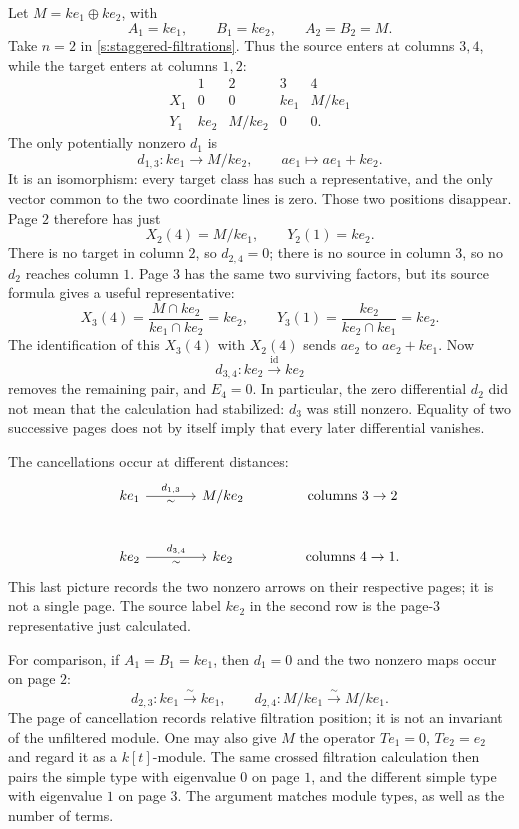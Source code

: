 \documentclass[11pt]{article}
\theoremstyle{definition}
\theoremstyle{remark}\newtheorem{remark}[theorem]{Remark}
\newcommand{\id}{\mathrm{id}}
\newcommand{\kk}{k}
\newcommand{\iso}{\xrightarrow{\sim}}
\begin{document}
Let $M=\kk e_1\oplus\kk e_2$, with
\[
A_1=\kk e_1,\qquad B_1=\kk e_2,\qquad A_2=B_2=M.
\]
Take $n=2$ in \eqref{s:staggered-filtrations}. Thus the source enters at
columns $3,4$, while the target enters at columns $1,2$:
\[
\begin{array}{c|cccc}
&1&2&3&4\\ \hline
X_1&0&0&\kk e_1&M/\kk e_1\\
Y_1&\kk e_2&M/\kk e_2&0&0.
\end{array}
\]
The only potentially nonzero $d_1$ is
\[
d_{1,3}:\kk e_1\longrightarrow M/\kk e_2,
\qquad ae_1\longmapsto ae_1+\kk e_2.
\]
It is an isomorphism: every target class has such a representative, and
the only vector common to the two coordinate lines is zero. Those two
positions disappear. Page $2$ therefore has just
\[
X_2(4)=M/\kk e_1,\qquad Y_2(1)=\kk e_2.
\]
There is no target in column $2$, so $d_{2,4}=0$; there is no source
in column $3$, so no $d_2$ reaches column $1$. Page $3$ has the same two
surviving factors, but its source formula gives a useful representative:
\[
X_3(4)=\frac{M\cap\kk e_2}{\kk e_1\cap\kk e_2}
       =\kk e_2,
\qquad
Y_3(1)=\frac{\kk e_2}{\kk e_2\cap\kk e_1}=\kk e_2.
\]
The identification of this $X_3(4)$ with $X_2(4)$ sends
$ae_2$ to $ae_2+\kk e_1$. Now
\[
d_{3,4}:\kk e_2\xrightarrow{\id}\kk e_2
\]
removes the remaining pair, and $E_4=0$.
In particular, the zero differential $d_2$ did not mean that the
calculation had stabilized: $d_3$ was still nonzero. Equality of two
successive pages does not by itself imply that every later differential
vanishes.

The cancellations occur at different distances:
\[
\begin{tikzcd}[column sep=large,row sep=large]
\kk e_1\arrow[r,"d_{1,3}","\sim"']&M/\kk e_2
&\text{columns }3\to2\\
\kk e_2\arrow[r,"d_{3,4}","\sim"']&\kk e_2
&\text{columns }4\to1.
\end{tikzcd}
\]
This last picture records the two nonzero arrows on their respective
pages; it is not a single page. The source label $\kk e_2$ in the second row
is the page-$3$ representative just calculated.

For comparison, if $A_1=B_1=\kk e_1$, then $d_1=0$ and the two nonzero
maps occur on page $2$:
\[
d_{2,3}:\kk e_1\iso\kk e_1,
\qquad
d_{2,4}:M/\kk e_1\iso M/\kk e_1.
\]
The page of cancellation records relative filtration position; it is not
an invariant of the unfiltered module. One may also give $M$ the operator
$Te_1=0$, $Te_2=e_2$ and regard it as a $\kk[t]$-module. The same crossed
filtration calculation then pairs the simple type with eigenvalue $0$
on page $1$, and the different simple type with eigenvalue $1$ on page
$3$. The argument matches module types, as well as the number of terms.
\end{document}
